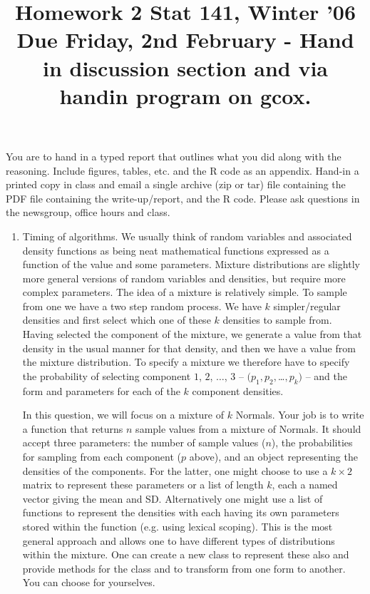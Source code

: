 \documentclass[11pt]{article}
\title{
 Homework 2  \hfil Stat 141, Winter '06   \\
 Due Friday, 2nd February - Hand in discussion section and via handin
 program on gcox.
}
\begin{document}
\maketitle

You are to hand in a typed report that outlines what you did along
with the reasoning. Include figures, tables, etc.  and the R code as
an appendix.  Hand-in a printed copy in class and email a single
archive (zip or tar) file containing the PDF file containing the
write-up/report, and the R code.  Please ask questions in the
newsgroup, office hours and class.


\begin{enumerate}

\item Timing of algorithms.  We usually think of random variables and
  associated density functions as being neat mathematical functions
  expressed as a function of the value and some parameters.  Mixture
  distributions are slightly more general versions of random variables
  and densities, but require more complex parameters.  The idea of a
  mixture is relatively simple.  To sample from one we have a two step
  random process.  We have $k$ simpler/regular densities and first
  select which one of these $k$ densities to sample from.  Having
  selected the component of the mixture, we generate a value from that
  density in the usual manner for that density, and then we have a
  value from the mixture distribution.  To specify a mixture we
  therefore have to specify the probability of selecting component
  $1$, $2$, $\ldots$, $3$ -- $(p_1, p_2, $\ldots$, p_k)$ -- and the
  form and parameters for each of the $k$ component densities.

  In this question, we will focus on a mixture of $k$ Normals.  Your
  job is to write a function that returns $n$ sample values from a
  mixture of Normals.  It should accept three parameters: the number
  of sample values ($n$), the probabilities for sampling from each
  component ($p$ above), and an object representing the densities of
  the components.  For the latter, one might choose to use a $k \times
  2$ matrix to represent these parameters or a list of length $k$, each
  a named vector giving the mean and SD.  Alternatively one might use
  a list of functions to represent the densities with each having its
  own parameters stored within the function (e.g. using lexical
  scoping). This is the most general approach and allows one to have
  different types of distributions within the mixture.  One can create
  a new class to represent these also and provide methods for the
  class and to transform from one form to another.  You can choose for
  yourselves.


\end{enumerate}
\end{document}
